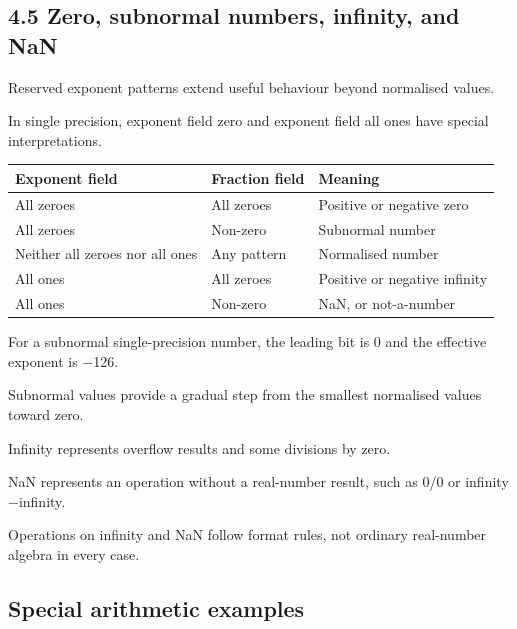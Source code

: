 \documentclass[11pt]{article}
\begin{document}
\begin{keepsection}
\section{4.5 Zero, subnormal numbers, infinity, and NaN}

Reserved exponent patterns extend useful behaviour beyond normalised values.

In single precision, exponent field zero and exponent field all ones have special interpretations.

\begin{center}\small\begin{tabularx}{\linewidth}{>{\raggedright\arraybackslash}X>{\raggedright\arraybackslash}X>{\raggedright\arraybackslash}X}\toprule
\textbf{Exponent field} & \textbf{Fraction field} & \textbf{Meaning} \\ \midrule
All zeroes & All zeroes & Positive or negative zero \\
All zeroes & Non-zero & Subnormal number \\
Neither all zeroes nor all ones & Any pattern & Normalised number \\
All ones & All zeroes & Positive or negative infinity \\
All ones & Non-zero & NaN, or not-a-number \\
\bottomrule\end{tabularx}\end{center}

For a subnormal single-precision number, the leading bit is 0 and the effective exponent is \ensuremath{-}126.

Subnormal values provide a gradual step from the smallest normalised values toward zero.

Infinity represents overflow results and some divisions by zero.

NaN represents an operation without a real-number result, such as 0/0 or infinity\ensuremath{-}infinity.

Operations on infinity and NaN follow format rules, not ordinary real-number algebra in every case.

\begin{keepsection}
\subsection{Special arithmetic examples}


\end{keepsection}
\end{keepsection}
\end{document}
